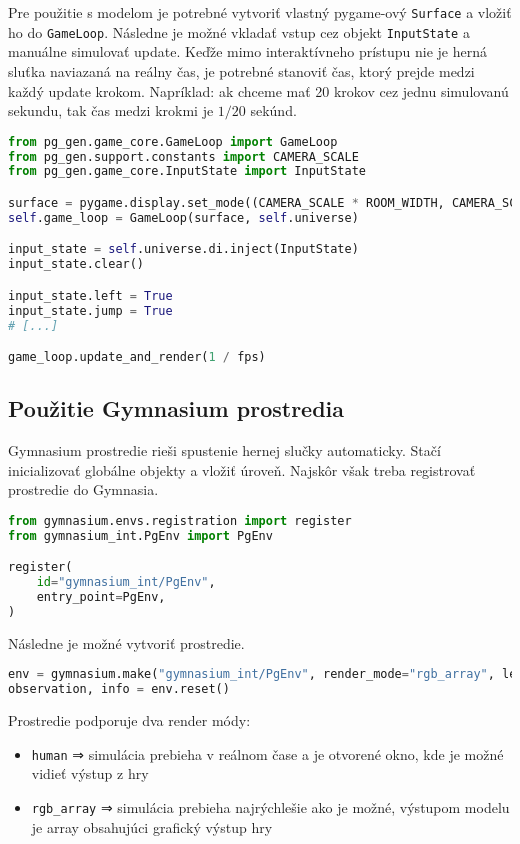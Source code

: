Pre použitie s modelom je potrebné vytvoriť vlastný pygame-ový \texttt{Surface} a vložiť ho do \texttt{GameLoop}. Následne je možné vkladať vstup cez objekt \texttt{InputState} a manuálne simulovať update. Keďže mimo interaktívneho prístupu nie je herná sluťka naviazaná na reálny čas, je potrebné stanoviť čas, ktorý prejde medzi každý update krokom. Napríklad: ak chceme mať 20 krokov cez jednu simulovanú sekundu, tak čas medzi krokmi je $ 1 / 20 $ sekúnd.

\begin{lstlisting}[language=python]
from pg_gen.game_core.GameLoop import GameLoop
from pg_gen.support.constants import CAMERA_SCALE
from pg_gen.game_core.InputState import InputState

surface = pygame.display.set_mode((CAMERA_SCALE * ROOM_WIDTH, CAMERA_SCALE * ROOM_HEIGHT))
self.game_loop = GameLoop(surface, self.universe)

input_state = self.universe.di.inject(InputState)
input_state.clear()

input_state.left = True
input_state.jump = True
# [...]

game_loop.update_and_render(1 / fps)
\end{lstlisting}

\subsection*{Použitie Gymnasium prostredia}

Gymnasium prostredie rieši spustenie hernej slučky automaticky. Stačí inicializovať globálne objekty a vložiť úroveň. Najskôr však treba registrovať prostredie do Gymnasia.

\begin{lstlisting}[language=python]
from gymnasium.envs.registration import register
from gymnasium_int.PgEnv import PgEnv

register(
    id="gymnasium_int/PgEnv",
    entry_point=PgEnv,
)
\end{lstlisting}

Následne je možné vytvoriť prostredie.

\begin{lstlisting}[language=python]
env = gymnasium.make("gymnasium_int/PgEnv", render_mode="rgb_array", level=level)
observation, info = env.reset()
\end{lstlisting}

Prostredie podporuje dva render módy:

\begin{itemize}
    \item \texttt{human} ⇒ simulácia prebieha v reálnom čase a je otvorené okno, kde je možné vidieť výstup z hry
    \item \texttt{rgb\_array} ⇒ simulácia prebieha najrýchlešie ako je možné, výstupom modelu je array obsahujúci grafický výstup hry
\end{itemize}

